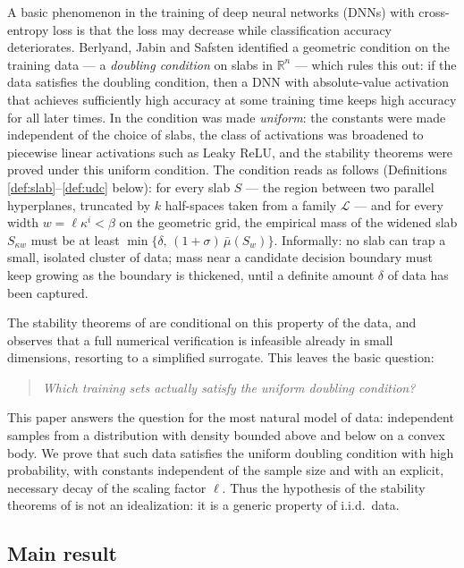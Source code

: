 \documentclass[11pt]{article}
\newcommand{\R}{\mathbb{R}}
\begin{document}
A basic phenomenon in the training of deep neural networks (DNNs) with cross-entropy
loss is that the loss may decrease while classification accuracy deteriorates.
Berlyand, Jabin and Safsten \cite{BJS} identified a geometric condition on the
training data --- a \emph{doubling condition} on slabs in $\R^n$ --- which rules this
out: if the data satisfies the doubling condition, then a DNN with absolute-value
activation that achieves sufficiently high accuracy at some training time keeps high
accuracy for all later times.  In \cite{ShmaloUDC} the condition was made
\emph{uniform}: the constants were made independent of the choice of slabs, the class
of activations was broadened to piecewise linear activations such as Leaky ReLU, and
the stability theorems were proved under this uniform condition.  The condition reads
as follows (Definitions \ref{def:slab}--\ref{def:udc} below): for every slab
$S$ --- the region between two parallel hyperplanes, truncated by $k$ half-spaces
taken from a family $\mathcal L$ --- and for every width $w=\ell\kappa^i<\beta$ on the
geometric grid, the empirical mass of the widened slab $S_{\kappa w}$ must be at
least $\min\{\delta,\,(1+\sigma)\,\bar\mu(S_w)\}$.  Informally: no slab can trap a
small, isolated cluster of data; mass near a candidate decision boundary must keep
growing as the boundary is thickened, until a definite amount $\delta$ of data has
been captured.

The stability theorems of \cite{BJS,ShmaloUDC} are conditional on this property of
the data, and \cite{ShmaloUDC} observes that a full numerical verification is
infeasible already in small dimensions, resorting to a simplified surrogate.  This
leaves the basic question:

\begin{quote}
\emph{Which training sets actually satisfy the uniform doubling condition?}
\end{quote}

This paper answers the question for the most natural model of data: independent
samples from a distribution with density bounded above and below on a convex body.
We prove that such data satisfies the uniform doubling condition with high
probability, with constants independent of the sample size and with an explicit,
necessary decay of the scaling factor $\ell$.  Thus the hypothesis of the stability
theorems of \cite{BJS,ShmaloUDC} is not an idealization: it is a generic property of
i.i.d.\ data.

\subsection*{Main result}
\end{document}
